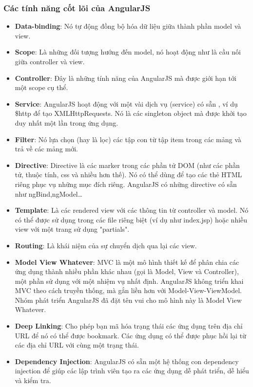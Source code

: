 \documentclass[a4paper]{article}
\begin{document}
\subsubsection{Các tính năng cốt lõi của AngularJS}
\begin{itemize}
	\item \textbf{Data-binding}: Nó tự động đồng bộ hóa dữ liệu giữa thành phần model và view.

	\item \textbf{Scope}: Là những đối tượng hướng đến model, nó hoạt động như là cầu nối giữa controller và view.

	\item \textbf{Controller}: Đây là những tính năng của AngularJS mà được giới hạn tới một scope cụ thể.

	\item \textbf{Service}: AngularJS hoạt động với một vài dịch vụ (service) có sẵn , ví dụ \$http để tạo XMLHttpRequests. Nó là các singleton object mà được khởi tạo duy nhất một lần trong ứng dụng.

	\item \textbf{Filter}: Nó lựa chọn (hay là lọc) các tập con từ tập item trong các mảng và trả về các mảng mới.

	\item \textbf{Directive}: Directive là các marker trong các phần tử DOM (như các phần tử, thuộc tính, css và nhiều hơn thế). Nó có thể dùng để tạo các thẻ HTML riêng phục vụ những mục đích riêng. AngularJS có những directive có sẵn như ngBind,ngModel…

	\item \textbf{Template}: Là các rendered view với các thông tin từ controller và model. Nó có thể được sử dụng trong các file riêng biệt (ví dụ như index.jsp) hoặc nhiều view với một trang sử dụng "partials".

	\item \textbf{Routing}: Là khái niệm của sự chuyển dịch qua lại các view.

	\item \textbf{Model View Whatever}: MVC là một mô hình thiết kế để phân chia các ứng dụng thành nhiều phần khác nhau (gọi là Model, View và Controller), một phần sử dụng với một nhiệm vụ nhất định. AngularJS không triển khai MVC theo cách truyền thống, mà gắn liền hơn với Model-View-ViewModel. Nhóm phát triển AngularJS đã đặt tên vui cho mô hình này là Model View Whatever.

	\item \textbf{Deep Linking}: Cho phép bạn mã hóa trạng thái các ứng dụng trên địa chỉ URL để nó có thể được bookmark. Các ứng dụng có thể được phục hồi lại từ các địa chỉ URL với cùng một trạng thái.

	\item \textbf{Dependency Injection}: AngularJS có sẵn một hệ thống con dependency injection để giúp các lập trình viên tạo ra các ứng dụng dễ phát triển, dễ hiểu và kiểm tra.
\end{itemize}
\end{document}
